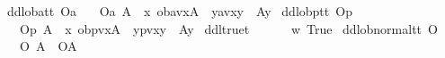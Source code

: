 \begin{isabellebody}
\ ddloba{\isacharcolon}{\isacharcolon}{\isachardoublequoteopen}t{\isasymRightarrow}t{\isachardoublequoteclose}\ {\isacharparenleft}{\isachardoublequoteopen}O\isactrlsub a{\isachardoublequoteclose}{\isacharparenright}\isanewline
\ \ \ {\isachardoublequoteopen}O\isactrlsub a\ A\ {\isasymequiv}\ {\isasymlambda}x{\isachardot}\ ob{\isacharparenleft}av{\isacharparenleft}x{\isacharparenright}{\isacharparenright}{\isacharparenleft}A{\isacharparenright}\ {\isasymand}\ {\isacharparenleft}{\isasymexists}y{\isachardot}{\isacharparenleft}av{\isacharparenleft}x{\isacharparenright}{\isacharparenleft}y{\isacharparenright}\ {\isasymand}\ {\isasymnot}A{\isacharparenleft}y{\isacharparenright}{\isacharparenright}{\isacharparenright}{\isachardoublequoteclose}\isanewline
{}\isamarkupfalse%
\ ddlobp{\isacharcolon}{\isacharcolon}{\isachardoublequoteopen}t{\isasymRightarrow}t{\isachardoublequoteclose}\ {\isacharparenleft}{\isachardoublequoteopen}O\isactrlsub p{\isachardoublequoteclose}{\isacharparenright}\isanewline
\ \ \ {\isachardoublequoteopen}O\isactrlsub p\ A\ {\isasymequiv}\ {\isasymlambda}x{\isachardot}\ ob{\isacharparenleft}pv{\isacharparenleft}x{\isacharparenright}{\isacharparenright}{\isacharparenleft}A{\isacharparenright}\ {\isasymand}\ {\isacharparenleft}{\isasymexists}y{\isachardot}{\isacharparenleft}pv{\isacharparenleft}x{\isacharparenright}{\isacharparenleft}y{\isacharparenright}\ {\isasymand}\ {\isasymnot}A{\isacharparenleft}y{\isacharparenright}{\isacharparenright}{\isacharparenright}{\isachardoublequoteclose}\isanewline
\isanewline
%
\isanewline
{}\isamarkupfalse%
\ ddltrue{\isacharcolon}{\isacharcolon}{\isachardoublequoteopen}t{\isachardoublequoteclose}\ {\isacharparenleft}{\isachardoublequoteopen}\isactrlbold {\isasymtop}{\isachardoublequoteclose}{\isacharparenright}\isanewline
\ \ \ {\isachardoublequoteopen}\isactrlbold {\isasymtop}\ {\isasymequiv}\ {\isasymlambda}w{\isachardot}\ True{\isachardoublequoteclose}\isanewline
{}\isamarkupfalse%
\ ddlob{\isacharunderscore}normal{\isacharcolon}{\isacharcolon}{\isachardoublequoteopen}t{\isasymRightarrow}t{\isachardoublequoteclose}\ {\isacharparenleft}{\isachardoublequoteopen}O\ {\isacharbraceleft}{\isacharunderscore}{\isacharbraceright}{\isachardoublequoteclose}{\isacharparenright}\isanewline
\ \ \ {\isachardoublequoteopen}{\isacharparenleft}O\ {\isacharbraceleft}A{\isacharbraceright}{\isacharparenright}\ {\isasymequiv}\ {\isacharparenleft}O{\isacharbraceleft}A{\isacharbar}\isactrlbold {\isasymtop}{\isacharbraceright}{\isacharparenright}\ {\isachardoublequoteclose}\isanewline

\end{isabellebody}
